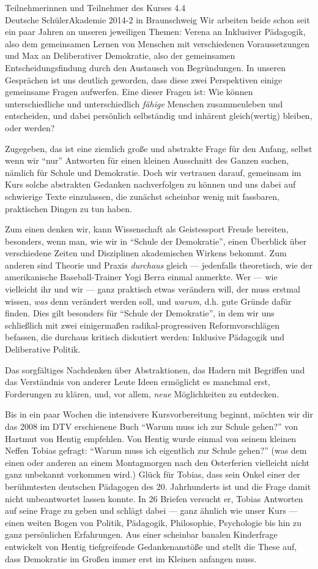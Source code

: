 \documentclass[a4paper]{letter}
\begin{document}
\begin{letter}{
	Teilnehmerinnen und Teilnehmer des Kurses 4.4 \\
	Deutsche SchülerAkademie 2014-2 in Braunschweig}
Wir arbeiten beide schon seit ein paar Jahren an unseren jeweiligen Themen: Verena an Inklusiver Pädagogik, also dem gemeinsamen Lernen von Menschen mit verschiedenen Voraussetzungen und Max an Deliberativer Demokratie, also der gemeinsamen Entscheidungsfindung durch den Austausch von Begründungen.
In unseren Gesprächen ist uns deutlich geworden, dass diese zwei Perspektiven einige gemeinsame Fragen aufwerfen.
Eine dieser Fragen ist:
Wie können unterschiedliche und unterschiedlich \emph{fähige} Menschen zusammenleben und entscheiden, und dabei persönlich selbständig und inhärent gleich(wertig) bleiben, oder werden?

Zugegeben, das ist eine ziemlich große und abstrakte Frage für den Anfang, selbst wenn wir ``nur'' Antworten für einen kleinen Ausschnitt des Ganzen suchen, nämlich für Schule und Demokratie.
Doch wir vertrauen darauf, gemeinsam im Kurs solche abstrakten Gedanken nachverfolgen zu können und uns dabei auf schwierige Texte einzulassen, die zunächst scheinbar wenig mit fassbaren, praktischen Dingen zu tun haben.

Zum einen denken wir, kann Wissenschaft als Geistessport Freude bereiten, besonders, wenn man, wie wir in ``Schule der Demokratie'', einen Überblick über verschiedene Zeiten und Disziplinen akademischen Wirkens bekommt.
Zum anderen sind Theorie und Praxis \emph{durchaus} gleich --- jedenfalls theoretisch, wie der amerikanische Baseball-Trainer Yogi Berra einmal anmerkte.
Wer --- wie vielleicht ihr und wir --- ganz praktisch etwas verändern will, der muss erstmal wissen, \emph{was} denn verändert werden soll, und \emph{warum}, d.h. gute Gründe dafür finden.
Dies gilt besonders für ``Schule der Demokratie'', in dem wir uns schließlich mit zwei einigermaßen radikal-progressiven Reformvorschlägen befassen, die durchaus kritisch diskutiert werden: Inklusive Pädagogik und Deliberative Politik.

Das sorgfältiges Nachdenken über Abstraktionen, das Hadern mit Begriffen und das Verständnis von anderer Leute Ideen ermöglicht es manchmal erst, Forderungen zu klären, und, vor allem, \emph{neue} Möglichkeiten zu entdecken.

Bis in ein paar Wochen die intensivere Kursvorbereitung beginnt, möchten wir dir das 2008 im DTV erschienene Buch ``Warum muss ich zur Schule gehen?'' von Hartmut von Hentig empfehlen.
Von Hentig wurde einmal von seinem kleinen Neffen Tobias gefragt: ``Warum muss ich eigentlich zur Schule gehen?'' (was dem einen oder anderen an einem Montagmorgen nach den Osterferien vielleicht nicht ganz unbekannt vorkommen wird.)
Glück für Tobias, dass sein Onkel einer der berühmtesten deutschen Pädagogen des 20. Jahrhunderts ist und die Frage damit nicht unbeantwortet lassen konnte.
In 26 Briefen versucht er, Tobias Antworten auf seine Frage zu geben und schlägt dabei --- ganz ähnlich wie unser Kurs --- einen weiten Bogen von Politik, Pädagogik, Philosophie, Psychologie bis hin zu ganz persönlichen Erfahrungen.
Aus einer scheinbar banalen Kinderfrage entwickelt von Hentig tiefgreifende Gedankenanstöße und stellt die These auf, dass Demokratie im Großen immer erst im Kleinen anfangen muss.


\end{letter}
\end{document}
